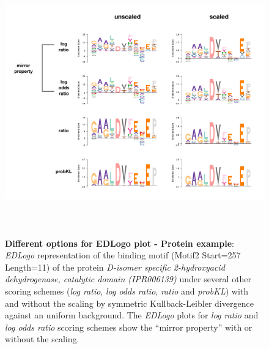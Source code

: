 \documentclass{bmcart}
\begin{document}
\begin{figure}[h!]
\centering
\includegraphics[height=4.5in, width=4.5in]{suppfig/Figure5.pdf}
\caption{\textbf{Different options for EDLogo plot - Protein example}:  \textit{EDLogo} representation  of the binding motif (Motif2 Start=257 Length=11) of the protein \textit{D-isomer specific 2-hydroxyacid dehydrogenase, catalytic domain (IPR006139)} under several other scoring schemes  (\textit{log ratio}, \textit{log odds ratio}, \textit{ratio} and \textit{probKL}) 
with and without the scaling by symmetric Kullback-Leibler divergence against an uniform background.  The \textit{EDLogo} plots for \textit{log ratio} and \textit{log odds ratio} scoring schemes show the ``mirror property'' with or without the scaling.}
\label{fig:suppfig5}
\end{figure}
\end{document}
